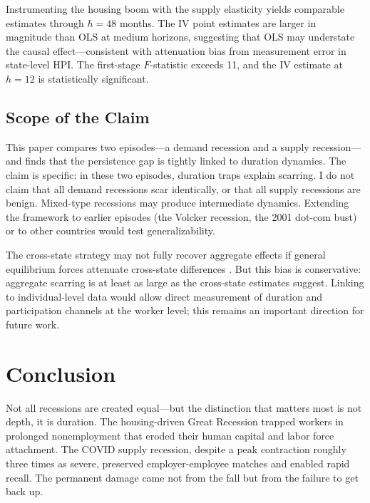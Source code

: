 \documentclass[12pt]{article}
\begin{document}
Instrumenting the housing boom with the \citet{saiz2010geographic} supply elasticity yields comparable estimates through $h = 48$ months. The IV point estimates are larger in magnitude than OLS at medium horizons, suggesting that OLS may understate the causal effect---consistent with attenuation bias from measurement error in state-level HPI. The first-stage $F$-statistic exceeds 11, and the IV estimate at $h = 12$ is statistically significant.

\subsection{Scope of the Claim}

This paper compares two episodes---a demand recession and a supply recession---and finds that the persistence gap is tightly linked to duration dynamics. The claim is specific: in these two episodes, duration traps explain scarring. I do not claim that all demand recessions scar identically, or that all supply recessions are benign. Mixed-type recessions \citep{guerrieri2022macroeconomic} may produce intermediate dynamics. Extending the framework to earlier episodes (the Volcker recession, the 2001 dot-com bust) or to other countries would test generalizability.

The cross-state strategy may not fully recover aggregate effects if general equilibrium forces attenuate cross-state differences \citep{beraja2019geography}. But this bias is conservative: aggregate scarring is at least as large as the cross-state estimates suggest. Linking to individual-level data would allow direct measurement of duration and participation channels at the worker level; this remains an important direction for future work.


\section{Conclusion}
\label{sec:conclusion}

Not all recessions are created equal---but the distinction that matters most is not depth, it is duration. The housing-driven Great Recession trapped workers in prolonged nonemployment that eroded their human capital and labor force attachment. The COVID supply recession, despite a peak contraction roughly three times as severe, preserved employer-employee matches and enabled rapid recall. The permanent damage came not from the fall but from the failure to get back up.
\end{document}
